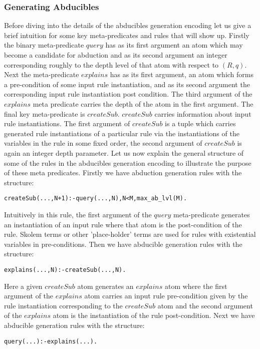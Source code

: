 \subsubsection{Generating Abducibles}
Before diving into the details of the abducibles generation encoding let us give a brief intuition for some key meta-predicates and rules that will show up. Firstly the binary meta-predicate $query$ has as its first argument an atom which may become a candidate for abduction and as its second argument an integer corresponding roughly to the depth level of that atom with respect to $(R,q)$. Next the meta-predicate $explains$ has as its first argument, an atom which forms a pre-condition of some input rule instantiation, and as its second argument the corresponding input rule instantiation post condition. The third argument of the $explains$ meta predicate carries the depth of the atom in the first argument. The final key meta-predicate is $createSub$. $createSub$ carries information about input rule instantiations. The first argument of $createSub$ is a tuple which carries generated rule instantiations of a particular rule via the instantiations of the variables in the rule in some fixed order, the second argument of $createSub$ is again an integer depth parameter. Let us now explain the general structure of some of the rules in the abducibles generation encoding to illustrate the purpose of these meta predicates. Firstly we have abduction generation rules with the structure:
\begin{lstlisting}[frame=none]
createSub(...,N+1):-query(...,N),N<M,max_ab_lvl(M).
\end{lstlisting}
Intuitively in this rule, the first argument of the $query$ meta-predicate generates an instantiation of an input rule where that atom is the post-condition of the rule. Skolem terms or other 'place-holder' terms are used for rules with existential variables in pre-conditions. Then we have abducible generation rules with the structure:
\begin{lstlisting}[frame=none]
explains(...,N):-createSub(...,N).
\end{lstlisting}
Here a given $createSub$ atom generates an $explains$ atom where the first argument of the $explains$ atom carries an input rule pre-condition given by the rule instantiation corresponding to the $createSub$ atom and the second argument of the $explains$ atom is the instantiation of the rule post-condition. Next we have abducible generation rules with the structure:
\begin{lstlisting}[frame=none]
query(...):-explains(...).
\end{lstlisting}
